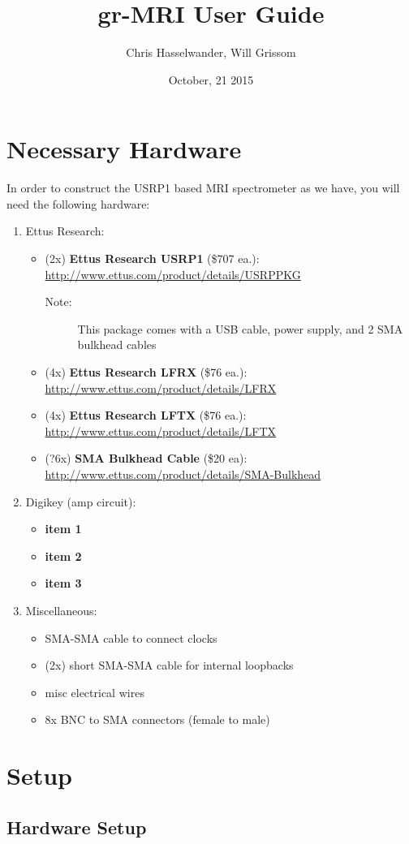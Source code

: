 \documentclass[11pt, oneside]{article}   	%
\title{gr-MRI User Guide}
\author{Chris Hasselwander, Will Grissom}
\date{October, 21 2015}
\begin{document}
\newpage
\tableofcontents
\newpage

\section{Necessary Hardware}
In order to construct the USRP1 based MRI spectrometer as we have, you will need the following hardware:
\begin{enumerate}
	\item Ettus Research:
	\begin{itemize}
		\item (2x) \textbf{Ettus Research USRP1} (\$707 ea.): \url{http://www.ettus.com/product/details/USRPPKG}
		\begin{description}
			\item[Note:] This package comes with a USB cable, power supply, and 2 SMA bulkhead cables
		\end{description}
		\item (4x) \textbf{Ettus Research LFRX} (\$76 ea.): \url{http://www.ettus.com/product/details/LFRX}
		\item (4x) \textbf{Ettus Research LFTX} (\$76 ea.): \url{http://www.ettus.com/product/details/LFTX}
		\item (?6x) \textbf{SMA Bulkhead Cable} (\$20 ea): \url{http://www.ettus.com/product/details/SMA-Bulkhead}
	\end{itemize}
	\item Digikey (amp circuit):
	\begin{itemize}
		\item \textbf{item 1}
		\item \textbf{item 2}
		\item \textbf{item 3}
	\end{itemize}
	\item Miscellaneous:
	\begin{itemize}
		\item SMA-SMA cable to connect clocks
		\item (2x) short SMA-SMA cable for internal loopbacks
		\item misc electrical wires
		\item 8x BNC to SMA connectors (female to male)
	\end{itemize}
\end{enumerate}

\section{Setup}
\subsection{Hardware Setup}
\end{document}
